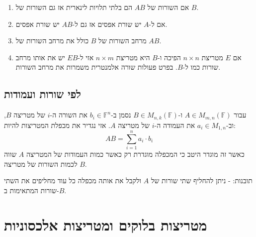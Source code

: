 \documentclass{tstextbook}
\begin{document}
\begin{enumerate}
  \item אם השורות של \(AB\) הם בלתי תלויות לינארית אז גם השורות של \(B\). 


  \item אם ל-\(A\) יש שורת אפסים אז גם ל-\(AB\) יש שורת אפסים. 


  \item מרחב השורות של \(B\) כולל את מרחב השורות של \(AB\). 


  \item אם \(E\) מטריצת \(n\times n\) הפיכה ו-\(B\) היא מטריצת \(n\times m\) אזי ל-\(EB\) יש את אותו מרחב שורות כמו ל-\(B\). בפרט פעולות שורה אלמנטרית משמרות את מרחב השורות. 


\end{enumerate}
\subsection{לפי שורות ועמודות}

\begin{definition}
עבור \(A \in M_{m,n}\left( \mathbb{F}  \right)\) ו-\(B \in M_{n,k}\left( \mathbb{F}  \right)\) נסמן ב-\(b_{i}\in \mathbb{F} ^{n}\) את השורה ה-\(i\) של מטריצה \(B\), וב-\(a_{i}\in M_{1,n}\) את העמודה ה-\(i\) של מטריצה \(A\). אזי נגדיר את מכפלת המטריצות להיות:
$$AB=\sum_{i=1}^{n} a_{i}\cdot b_{i}$$
כאשר זה מוגדר היטב כי המכפלה מוגדרת רק כאשר כמות העמודות של המטריצה \(A\) שווה לכמות השורות של מטריצה \(B\).

\end{definition}
תובנות:
- ניתן להחליף שתי שורות של \(A\) ולקבל את אותה מכפלה כל עוד מחליפים את השתי שורות המתאימות ב-\(B\).

\section{מטריצות בלוקים ומטריצות אלכסוניות}
\end{document}
